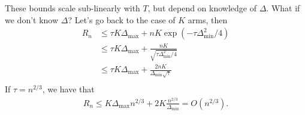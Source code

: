 \documentclass[11pt]{article}
\newcommand{\1}{\mathbf{1}}
\begin{document}
 These bounds scale sub-linearly with $T$, but depend on knowledge of $\Delta$. What if we don't know $\Delta$? Let's go back to the case of $K$ arms, then 
 \begin{align*}
   R_n 
   &\leq \tau K\Delta_{\max} + n K\exp(-\tau\Delta_{\min}^2/4)  \\
   &\leq \tau K\Delta_{\max} + \frac{n K}{\sqrt{\tau\Delta_{\min}^2/4}} \\
   &\leq \tau K\Delta_{\max} + \frac{2n K}{\Delta_{\min}\sqrt{\tau}} \\
 \end{align*}
If $\tau = n^{2/3}$, we have that 
\begin{align*}
    R_n \leq K\Delta_{\max} n^{2/3} + 2K \frac{n^{2/3}}{\Delta_{\min}} = O(n^{2/3}).
\end{align*}





\end{document}
